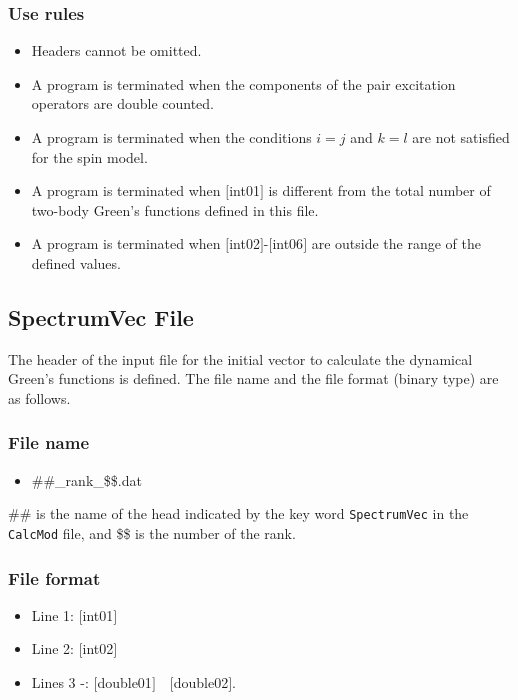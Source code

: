 \subsubsection{Use rules}
\begin{itemize}
\item Headers cannot be omitted. 
\item A program is terminated when the components of the pair excitation operators are double counted.
\item {A program is terminated when the conditions $i=j$ and $k=l$ are not satisfied for the spin model.}
\item A program is terminated when $[$int01$]$ is different from the total number of two-body Green's functions defined in this file.
\item A program is terminated when $[$int02$]$-$[$int06$]$ are outside the range of the defined values.
\end{itemize}

\newpage
\subsection{{SpectrumVec File}}
\label{Subsec:spectrumvec}
The header of the input file for the initial vector to calculate the dynamical Green's functions is defined.
The file name and the file format (binary type) are as follows.

\subsubsection{File name}
\begin{itemize}
   \item{\#\#\_rank\_\$\$.dat}   
\end{itemize}
  \#\# is the name of the head indicated by the key word \verb|SpectrumVec| in the  \verb|CalcMod| file, and \$\$  is the number of the rank.

\subsubsection{File format}
 \begin{itemize}
   \item  Line 1: $[$int01$]$
   \item  Line 2: $[$int02$]$
   \item  Lines 3 -: $[$double01$]$~~$[$double02$]$.
  \end{itemize}
  
